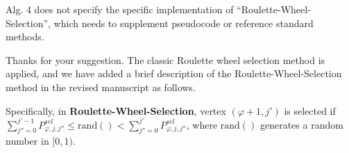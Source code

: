 \begin{revcomment}
	Alg. 4 does not specify the specific implementation of ``Roulette-Wheel-Selection'', which needs to supplement pseudocode or reference standard methods.
\end{revcomment}
\begin{revresponse}
	Thanks for your suggestion.
	The classic Roulette wheel selection method is applied, and we have added a brief description of the Roulette-Wheel-Selection method in the revised manuscript as follows.
	\begin{changes}
		Specifically, in \textbf{Roulette-Wheel-Selection}, vertex $(\varphi+1, j')$ is selected if $\sum_{j''=0}^{j'-1}{P^{sel}_{\varphi,j,j''}}\leq \text{rand}() < \sum_{j''=0}^{j'}{P^{sel}_{\varphi,j,j''}}$, where $\text{rand}()$ generates a random number in $[0,1)$.
	\end{changes}
\end{revresponse}

